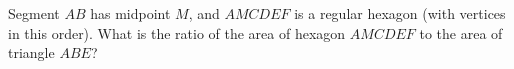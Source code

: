 Segment $AB$ has midpoint $M$, and $AMCDEF$ is a regular hexagon (with vertices in this order). What is the ratio of the area of hexagon $AMCDEF$ to the area of triangle $ABE$?
